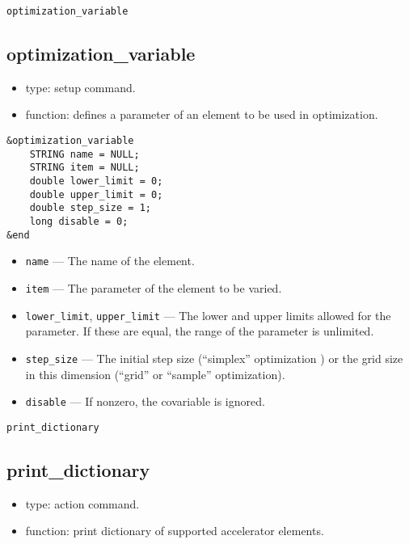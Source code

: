 \documentclass[11pt]{article}
\begin{document}
\begin{latexonly}
\newpage
\begin{center}{\Large\verb|optimization_variable|}\end{center}
\end{latexonly}
\subsection{optimization\_variable \label{subsec:optimizationvariable}}

\begin{itemize}
\item type: setup command.
\item function: defines a parameter of an element to be used in optimization.
\end{itemize}

\begin{verbatim}
&optimization_variable
    STRING name = NULL;
    STRING item = NULL;
    double lower_limit = 0;
    double upper_limit = 0;
    double step_size = 1;
    long disable = 0;
&end
\end{verbatim}

\begin{itemize}
\item \verb|name| --- The name of the element.
\item \verb|item| --- The parameter of the element to be varied.
\item \verb|lower_limit|, \verb|upper_limit| --- The lower and upper limits allowed for the parameter.  If these are
equal, the range of the parameter is unlimited.
\item \verb|step_size| --- The initial step size (``simplex'' optimization ) or the grid size in this dimension (``grid'' or ``sample'' optimization).
\item \verb|disable| --- If nonzero, the covariable is ignored.
\end{itemize}

\begin{latexonly}
\newpage
\begin{center}{\Large\verb|print_dictionary|}\end{center}
\end{latexonly}
\subsection{print\_dictionary \label{subsec:printdictionary}}

\begin{itemize}
\item type: action command.
\item function: print dictionary of supported accelerator elements.
\end{itemize}
\end{document}
